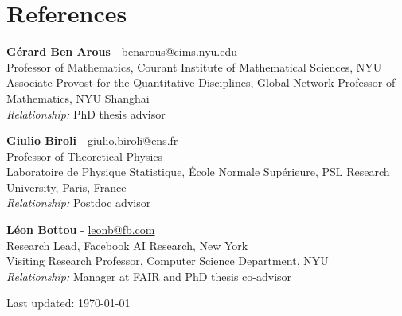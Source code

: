 \documentclass[10pt,letterpaper]{article}
\renewenvironment{itemize}
{
\begin{list}{}{\setlength{\leftmargin}{1.5em}}
}
{
  \end{list}
}
\begin{document}
\section*{References}

\begin{itemize}

\item \textbf{G\'erard Ben Arous} - \url{benarous@cims.nyu.edu} \\
Professor of Mathematics, Courant Institute of Mathematical Sciences, NYU \\
Associate Provost for the Quantitative Disciplines, Global Network Professor of Mathematics, NYU Shanghai \\
\textit{Relationship:} PhD thesis advisor

\item \textbf{Giulio Biroli} - \url{giulio.biroli@ens.fr} \\
Professor of Theoretical Physics \\
Laboratoire de Physique Statistique, \'Ecole Normale Sup\'erieure, PSL Research University, Paris, France \\
\textit{Relationship:} Postdoc advisor

\item \textbf{L\'eon Bottou} - \url{leonb@fb.com} \\
Research Lead, Facebook AI Research, New York \\
Visiting Research Professor, Computer Science Department, NYU \\
\textit{Relationship:} Manager at FAIR and PhD thesis co-advisor

\end{itemize}


\begin{center}
  \begin{footnotesize}
    Last updated: \today
  \end{footnotesize}
\end{center}
\end{document}

